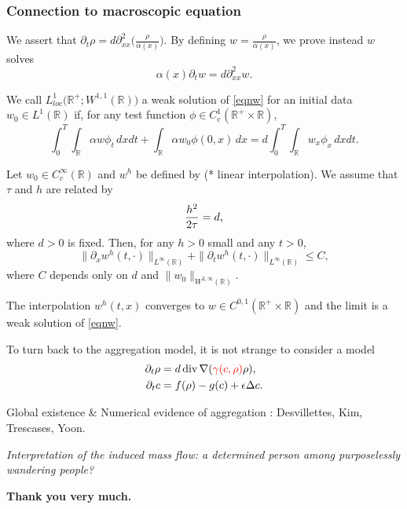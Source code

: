\documentclass{beamer}
\def\red{\color{red}}
\def\blue{\color{blue}}
\def\R{\mathbb{R}}
\def\div{\,\textrm{div}\,}
\begin{document}
  \begin{frame}
  \frametitle{Connection to macroscopic equation}
   We assert that $\partial_t \rho = d \partial^2_{xx} \big(\frac{\rho}{\alpha(x)}\big)$. By defining $w=\frac{\rho}{\alpha(x)}$, we prove instead $w$ solves
   \begin{equation} \label{eqnw}\alpha(x)\partial_t w = d \partial^2_{xx} w. \end{equation}\pause
 \begin{definition} We call $L^1_{loc}\big(\R^+;W^{1,1}(\R)\big)$ a weak solution of
\eqref{eqnw} for an initial data $w_0 \in L^1(\R)$ if, for any test function $\phi \in
C_c^1(\R^+\times \R)$,
 \begin{equation}\label{DefWeak}
  \int_0^T\int_\R \alpha w\phi_t\,dxdt
  +\int_\R\alpha w_0\phi(0,x)\,dx = d\int_0^T\int_\R w_x\phi_x\, dxdt.
 \end{equation}
\end{definition}
\end{frame}

\begin{frame}
\begin{lemma} \label{misc}
Let $w_0\in C^{\infty}_c(\R)$ and $w^h$ be defined by {\red (* linear interpolation)}. We assume that $\tau$ and $h$ are related by
$$
{h^2\over 2\tau}=d,
$$
where $d>0$ is fixed. Then, for any $h>0$ small and any $t>0$, 
$$\|\partial_x w^h(t,\cdot)\|_{L^\infty(\R)} + \|\partial_t w^h(t,\cdot)\|_{L^\infty(\R)} \le C,$$
where $C$ depends only on $d$ and $\|w_0\|_{W^{2,\infty}(\R)}.$
\end{lemma}

\begin{theorem}[Kim, L]
  The interpolation $w^{h}(t,x)$ converges to $w\in C^{0,1}(\R^+\times\R)$ and the limit is a weak solution of \eqref{eqnw}.
\end{theorem}
\end{frame}
\begin{frame}
   To turn back to the aggregation model, it is not strange to consider a model
   \begin{align*}
    \partial_t \rho &= d \div \nabla ({\red \gamma(c,\rho)} \rho),\\
    \partial_t c &= f(\rho) - g(c) + \epsilon \Delta c.
   \end{align*}
   
   Global existence \& Numerical evidence of aggregation : Desvillettes, Kim, Trescases, Yoon. \pause

   {\it Interpretation of the induced mass flow: a determined person among purposelessly wandering people?}

\end{frame}


\begin{frame}
 \center
 \vfill
 
 {\bf \huge \blue  Thank you very much.}
 
 \vfill
\end{frame}
\end{document}
